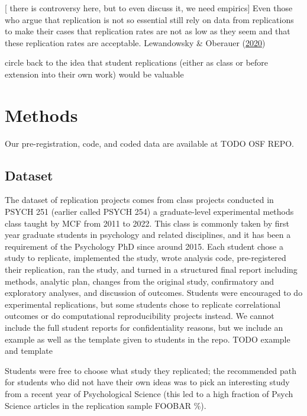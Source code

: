 \documentclass[
  english,
  a4paper,
]{article}
\begin{document}
{[} there is controversy here, but to even discuss it, we need empirics{]} Even those who argue that replication is not so essential still rely on data from replications to make their cases that replication rates are not as low as they seem and that these replication rates are acceptable. Lewandowsky \& Oberauer (\protect\hyperlink{ref-lewandowsky2020}{2020})

circle back to the idea that student replications (either as class or before extension into their own work) would be valuable

\hypertarget{methods}{%
\section{Methods}\label{methods}}

Our pre-registration, code, and coded data are available at TODO OSF REPO.

\hypertarget{dataset}{%
\subsection{Dataset}\label{dataset}}

The dataset of replication projects comes from class projects conducted in PSYCH 251 (earlier called PSYCH 254) a graduate-level experimental methods class taught by MCF from 2011 to 2022. This class is commonly taken by first year graduate students in psychology and related disciplines, and it has been a requirement of the Psychology PhD since around 2015. Each student chose a study to replicate, implemented the study, wrote analysis code, pre-registered their replication, ran the study, and turned in a structured final report including methods, analytic plan, changes from the original study, confirmatory and exploratory analyses, and discussion of outcomes. Students were encouraged to do experimental replications, but some students chose to replicate correlational outcomes or do computational reproducibility projects instead. We cannot include the full student reports for confidentiality reasons, but we include an example as well as the template given to students in the repo. TODO example and template

Students were free to choose what study they replicated; the recommended path for students who did not have their own ideas was to pick an interesting study from a recent year of Psychological Science (this led to a high fraction of Psych Science articles in the replication sample FOOBAR \%).
\end{document}
